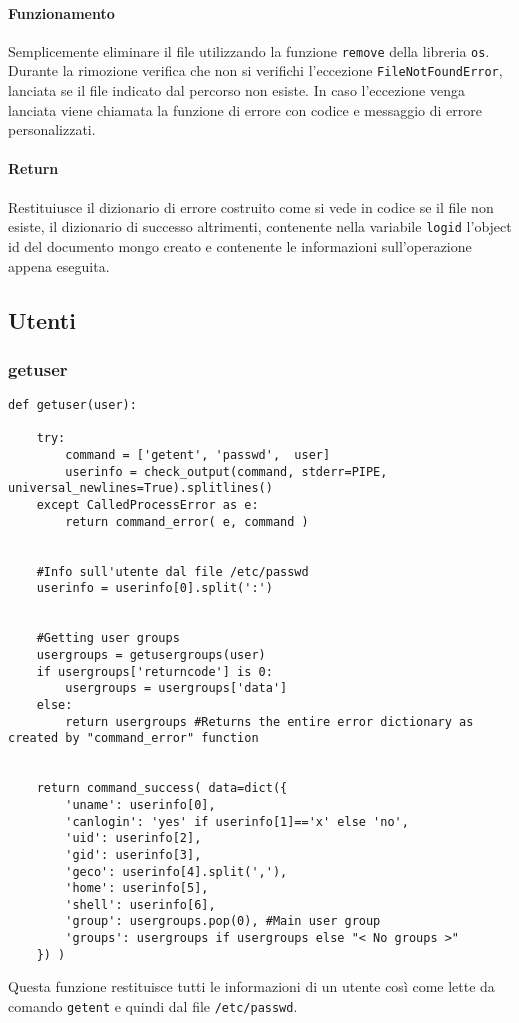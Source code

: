 \documentclass[11pt]{article}
\begin{document}
\paragraph{Funzionamento}
Semplicemente eliminare il file utilizzando la funzione \texttt{remove} della libreria \texttt{os}. Durante la rimozione
verifica che non si verifichi l'eccezione \texttt{FileNotFoundError}, lanciata se il file indicato dal percorso non esiste.
In caso l'eccezione venga lanciata viene chiamata la funzione di errore con codice e messaggio di errore personalizzati.
\paragraph{Return}
Restituiusce il dizionario di errore costruito come si vede in codice se il file non esiste, il dizionario di successo
altrimenti, contenente nella variabile \texttt{logid} l'object id del documento mongo creato e contenente le informazioni
sull'operazione appena eseguita.

\subsection{Utenti}\label{users}
\subsubsection{getuser}\label{getuser}
\begin{lstlisting}
def getuser(user):

    try:
        command = ['getent', 'passwd',  user]
        userinfo = check_output(command, stderr=PIPE, universal_newlines=True).splitlines()
    except CalledProcessError as e:
        return command_error( e, command )
    

    #Info sull'utente dal file /etc/passwd
    userinfo = userinfo[0].split(':')


    #Getting user groups
    usergroups = getusergroups(user)
    if usergroups['returncode'] is 0:
        usergroups = usergroups['data']
    else:
        return usergroups #Returns the entire error dictionary as created by "command_error" function


    return command_success( data=dict({
    	'uname': userinfo[0],
    	'canlogin': 'yes' if userinfo[1]=='x' else 'no',
    	'uid': userinfo[2],
    	'gid': userinfo[3],
    	'geco': userinfo[4].split(','),
    	'home': userinfo[5],
    	'shell': userinfo[6],
    	'group': usergroups.pop(0), #Main user group
    	'groups': usergroups if usergroups else "< No groups >"
    }) )
\end{lstlisting}
Questa funzione restituisce tutti le informazioni di un utente così come lette da comando \texttt{getent} e quindi dal file \texttt{/etc/passwd}.
\end{document}
